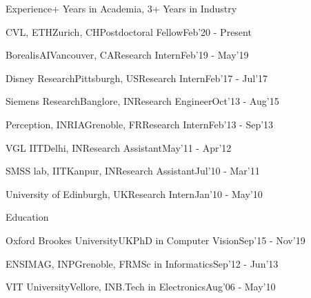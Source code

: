\documentclass{resume} %
\begin{document}

\begin{paracol}{2}
\setlength{\columnsep}{2em}
\begin{rSection}{Experience}{+ Years in Academia, 3+ Years in Industry}
\begin{rSubsection}{CVL, ETH}{Zurich, CH}{Postdoctoral Fellow}{Feb'20 - Present}\end{rSubsection}
\begin{rSubsection}{BorealisAI}{Vancouver, CA}{Research Intern}{Feb'19 - May'19}\end{rSubsection}
\begin{rSubsection}{Disney Research}{Pittsburgh, US}{Research Intern}{Feb'17 - Jul'17}\end{rSubsection}
\begin{rSubsection}{Siemens Research}{Banglore, IN}{Research Engineer}{Oct'13 - Aug'15}\end{rSubsection}
\begin{rSubsection}{Perception, INRIA}{Grenoble, FR}{Research Intern}{Feb'13 - Sep'13}\end{rSubsection}
\begin{rSubsection}{VGL IIT}{Delhi, IN}{Research Assistant}{May'11 - Apr'12}\end{rSubsection}
\begin{rSubsection}{SMSS lab, IIT}{Kanpur, IN}{Research Assistant}{Jul'10 - Mar'11}\end{rSubsection}
\begin{rSubsection}{University of Edinburgh}{, UK}{Research Intern}{Jan'10 - May'10}\end{rSubsection}
\end{rSection}

\begin{rSection}{Education}{}
\begin{eSubsection}{Oxford Brookes University}{UK}{PhD in Computer Vision}{Sep'15 - Nov'19}\end{eSubsection}
\begin{eSubsection}{ENSIMAG, INP}{Grenoble, FR}{MSc in Informatics}{Sep'12 - Jun'13}\end{eSubsection}
\begin{eSubsection}{VIT University}{Vellore, IN}{B.Tech in Electronics}{Aug'06 - May'10}\end{eSubsection} 
\end{rSection}



\end{paracol}
\end{document}
